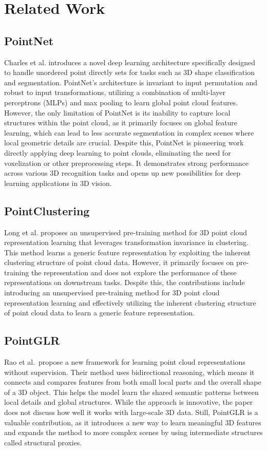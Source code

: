 \documentclass[../report.tex]{subfiles}
\begin{document}
    \section{Related Work}
    \label{sec:related_work}
     \subsection{PointNet}
     Charles et al.\cite{PointNet} introduces a novel deep learning architecture specifically designed to handle unordered point directly sets for tasks such as 3D shape classification and segmentation. PointNet's architecture is invariant to input permutation and robust to input transformations, utilizing a combination of multi-layer perceptrons (MLPs) and max pooling to learn global point cloud features. However, the only limitation of PointNet is its inability to capture local structures within the point cloud, as it primarily focuses on global feature learning, which can lead to less accurate segmentation in complex scenes where local geometric details are crucial. Despite this, PointNet is pioneering work directly applying deep learning to point clouds, eliminating the need for voxelization or other preprocessing steps. It demonstrates strong performance across various 3D recognition tasks and opens up new possibilities for deep learning applications in 3D vision.
    
    \subsection{PointClustering}
    Long et al. \cite{PointClustering} proposes an unsupervised pre-training method for 3D point cloud representation learning that leverages transformation invariance in clustering. This method learns a generic feature representation by exploiting the inherent clustering structure of point cloud data. However, it primarily focuses on pre-training the representation and does not explore the performance of these representations on downstream tasks. Despite this, the contributions include introducing an unsupervised pre-training method for 3D point cloud representation learning and effectively utilizing the inherent clustering structure of point cloud data to learn a generic feature representation.
    
    \subsection{PointGLR}
    Rao et al. \cite{PointGLR} propose a new framework for learning point cloud representations without supervision. Their method uses bidirectional reasoning, which means it connects and compares features from both small local parts and the overall shape of a 3D object. This helps the model learn the shared semantic patterns between local details and global structures. While the approach is innovative, the paper does not discuss how well it works with large-scale 3D data. Still, PointGLR is a valuable contribution, as it introduces a new way to learn meaningful 3D features and expands the method to more complex scenes by using intermediate structures called structural proxies.
    
\end{document}
